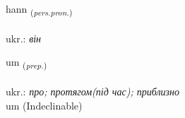 \documentclass[frontgrid, backgrid]{flacards}\usepackage[]{graphicx}\usepackage[]{xcolor}
\begin{document}
\renewcommand{\blhead}{\vskip5pt {\small\bfseries\footnotesize Fornafn | займенник }}
\renewcommand{\bcfoot}{\vskip5pt \hspace{2pt}{\small\bfseries\footnotesize 1K}}


{hann \small{\textsubscript{(\textit{pers.pron.})}} \\[1ex] %
\textphonetic{[han]} \\
ukr.: \emph{він} \\  [2ex]
\renewcommand*{\arraystretch}{0.8}
}


\renewcommand{\flhead}{\vskip5pt \fboxsep=0pt {\small\bfseries\footnotesize Forsetning | прийменник}}
\renewcommand{\fcfoot}{\vskip5pt \fboxsep=0pt \hspace{2pt}{\small\bfseries\footnotesize 1K}}

\renewcommand{\blhead}{\vskip5pt {\small\bfseries\footnotesize Forsetning | прийменник }}
\renewcommand{\bcfoot}{\vskip5pt \hspace{2pt}{\small\bfseries\footnotesize 1K}}


{um \small{\textsubscript{(\textit{prep.})}} \\[1ex]
\textphonetic{[ʏm]} \\
ukr.: \emph{про; протягом(під час); приблизно} \\  [2ex]
um (Indeclinable)}


\renewcommand{\flhead}{\vskip5pt \fboxsep=0pt {\small\bfseries\footnotesize Samtenging | сполучник}}
\renewcommand{\fcfoot}{\vskip5pt \fboxsep=0pt \hspace{2pt}{\small\bfseries\footnotesize 1K}}

\renewcommand{\blhead}{\vskip5pt {\small\bfseries\footnotesize Samtenging | сполучник }}
\renewcommand{\bcfoot}{\vskip5pt \hspace{2pt}{\small\bfseries\footnotesize 1K}}
\end{document}
